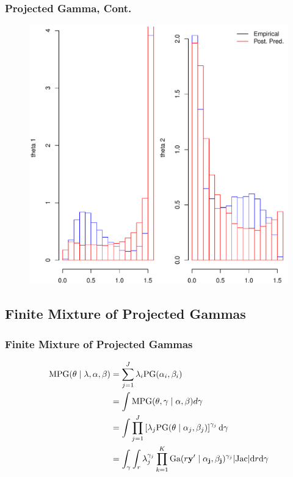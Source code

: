 \documentclass[aspectratio=169]{beamer}
\begin{document}
\begin{frame}
  \frametitle{Projected Gamma, Cont.}
	\begin{figure}
		\centering
    \includegraphics[scale = 0.4]{./images/justification_for_more_complex_models}
	\end{figure}
\end{frame}

\subsection{Finite Mixture of Projected Gammas}

\begin{frame}
  \frametitle{Finite Mixture of Projected Gammas}
  \begin{equation*}
    \begin{aligned}
      \text{MPG}({\bf \theta}\mid {\bf \lambda}, {\bf \alpha}, {\bf \beta}) &= \sum_{j = 1}^J\lambda_i\text{PG}(\alpha_i,\beta_i) \nonumber \\
      &= \int \text{MPG}({\bf \theta}, {\bf \gamma} \mid{\bf \alpha},{\bf \beta})d\gamma \nonumber \\
      &= \int \prod_{j = 1}^J\left[\lambda_j\text{PG}({\bf \theta}\mid\alpha_j,\beta_j)\right]^{\gamma_j}\text{d}\gamma \\
      &= \int_{\gamma}\int_{r}\lambda_j^{\gamma_j}\prod_{k = 1}^K\text{Ga}(r{\bf y}^{\prime}\mid{\bf \alpha_j},{\bf \beta_j})^{\gamma_j}\lvert\text{Jac}\rvert \text{d}r\text{d}\gamma
    \end{aligned}
  \end{equation*}
\end{frame}
\end{document}
